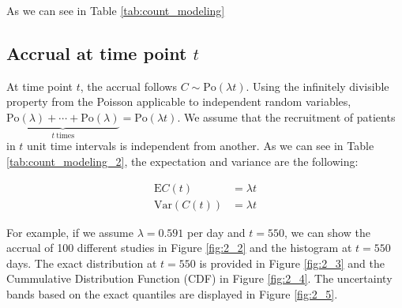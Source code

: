 As we can see in Table \ref{tab:count_modeling}

\subsection{Accrual at time point $t$}
At time point $t$, the accrual follows $C\sim \textrm{Po} (\lambda t)$. Using the infinitely divisible property from the Poisson applicable to independent random variables, $\underbrace{\textrm{Po} (\lambda) +\cdots +\textrm{Po} (\lambda)}_{t \ \text{times}} = \textrm{Po} (\lambda t)$. We assume that the recruitment of patients in $t$ unit time intervals is independent from another. As we can see in Table \ref{tab:count_modeling_2}, the expectation and variance are the following:

\begin{align*}
\textrm{E}C(t) & = \lambda t \\
\textrm{Var}(C(t)) & = \lambda t
\end{align*}

For example, if we assume $\lambda = 0.591$ per day and $t=550$, we can show the accrual of 100 different studies in Figure \ref{fig:2_2} and the histogram at $t=550$ days. The exact distribution at $t=550$ is provided in Figure \ref{fig:2_3} and the Cummulative Distribution Function (CDF) in Figure \ref{fig:2_4}. The uncertainty bands based on the exact quantiles are displayed in Figure \ref{fig:2_5}.

